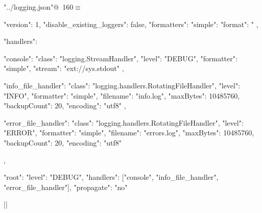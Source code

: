 \documentclass[%
    a4paper,    %
    justified,  %
    nobib,      %
    openany     %
]{tufte-book}
\begin{document}
\begin{flushleft} \small
\begin{minipage}{\linewidth}\label{scrap175}\raggedright\small
{} \verb@"../logging.json"@\nobreak\ {\footnotesize {160}}$\equiv$
\vspace{-1ex}
\begin{pythoncode}
{
    "version": 1,
    "disable_existing_loggers": false,
    "formatters": {
        "simple": {
            "format": "%
        }
    },

    "handlers": {
        "console": {
            "class": "logging.StreamHandler",
            "level": "DEBUG",
            "formatter": "simple",
            "stream": "ext://sys.stdout"
        },

        "info_file_handler": {
            "class": "logging.handlers.RotatingFileHandler",
            "level": "INFO",
            "formatter": "simple",
            "filename": "info.log",
            "maxBytes": 10485760,
            "backupCount": 20,
            "encoding": "utf8"
        },

        "error_file_handler": {
            "class": "logging.handlers.RotatingFileHandler",
            "level": "ERROR",
            "formatter": "simple",
            "filename": "errors.log",
            "maxBytes": 10485760,
            "backupCount": 20,
            "encoding": "utf8"
        }
    },

    "root": {
        "level": "DEBUG",
        "handlers": ["console", "info_file_handler", "error_file_handler"],
        "propagate": "no"
    }
}|\NWsep|
\end{pythoncode}
\vspace{1.5ex}
\footnotesize
\begin{list}{}{\setlength{\itemsep}{-\parsep}\setlength{\itemindent}{-\leftmargin}}

\item{}
\end{list}
\end{minipage}\vspace{4ex}
\end{flushleft}
\end{document}
